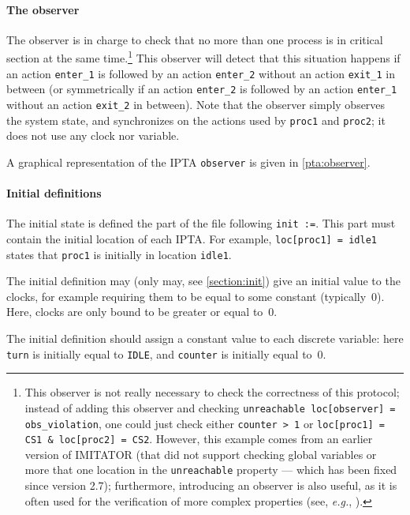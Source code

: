 \documentclass[a4paper,11pt]{report}
\makeatletter
\newcommand{\imitator}{\textsf{IMITATOR}}
\newcommand{\IPTA}{IPTA}
\newcommand{\styleIMI}[1]{\textcolor{imicolor}{\texttt{#1}}}
\newcommand{\eg}{\textcolor{colorok}{\textit{e.g.},\@}}
\makeatother
\begin{document}
\paragraph{The observer}
The observer is in charge to check that no more than one process is in critical section at the same time.\footnote{%
	This observer is not really necessary to check the correctness of this protocol;
	instead of adding this observer and checking \styleIMI{unreachable loc[observer] = obs\_violation}, one could just check either \styleIMI{counter > 1} or \styleIMI{loc[proc1] = CS1 \& loc[proc2] = CS2}.
	However, this example comes from an earlier version of \imitator{} (that did not support checking global variables or more that one location in the \styleIMI{unreachable} property --- which has been fixed since version 2.7); furthermore, introducing an observer is also useful, as it is often used for the verification of more complex properties (see, \eg{} \cite{ABL98,ABBL98}).
}
This observer will detect that this situation happens if an action \styleIMI{enter\_1} is followed by an action \styleIMI{enter\_2} without an action \styleIMI{exit\_1} in between (or symmetrically if an action \styleIMI{enter\_2} is followed by an action \styleIMI{enter\_1} without an action \styleIMI{exit\_2} in between).
Note that the observer simply observes the system state, and synchronizes on the actions used by \styleIMI{proc1} and \styleIMI{proc2}; it does not use any clock nor variable.

A graphical representation of the \IPTA{} \styleIMI{observer} is given in \cref{pta:observer}.


\paragraph{Initial definitions}
The initial state is defined the part of the file following \styleIMI{init :=}.
This part must contain the initial location of each \IPTA{}.
For example, \styleIMI{loc[proc1] = idle1} states that \styleIMI{proc1} is initially in location \styleIMI{idle1}.

The initial definition may (only may, see \cref{section:init}) give an initial value to the clocks, for example requiring them to be equal to some constant (typically~0).
Here, clocks are only bound to be greater or equal to~0.

The initial definition should assign a constant value to each discrete variable:
here \styleIMI{turn} is initially equal to \styleIMI{IDLE}, and \styleIMI{counter} is initially equal to~0.
\end{document}

